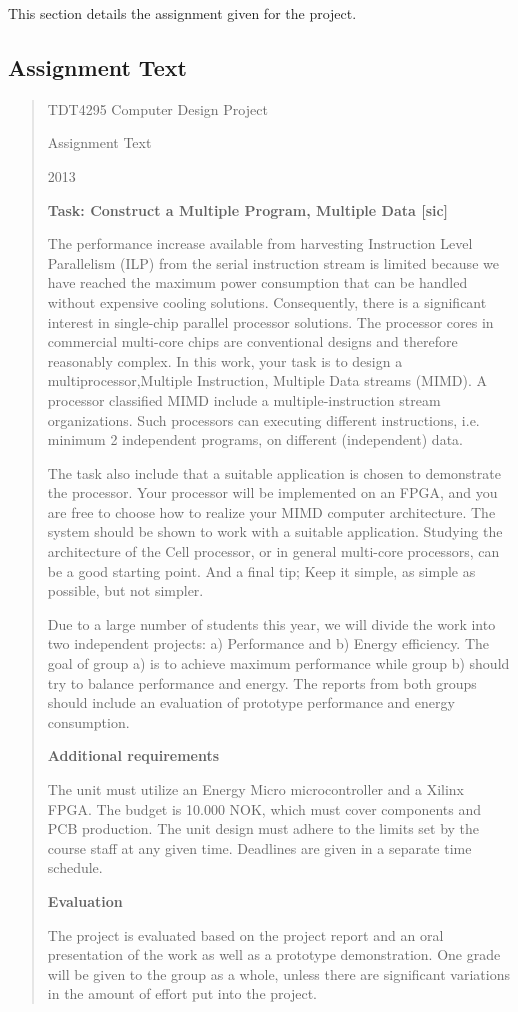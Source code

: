
This section details the assignment given for the project.

\subsection{Assignment Text}
\label{subsection:assignment-text}

\begin{quote}

\begin{center}
TDT4295 Computer Design Project

Assignment Text

2013 
\end{center}
 
\textbf{Task: Construct a Multiple Program, Multiple Data [sic]}

The performance increase available from harvesting Instruction Level Parallelism (ILP) from the serial instruction stream is limited because we have reached the maximum power consumption that can be handled without expensive cooling solutions.
Consequently, there is a significant interest in single-chip parallel processor solutions.
The processor cores in commercial multi-core chips are conventional designs and therefore reasonably complex.
In this work, your task is to design a multiprocessor,Multiple Instruction, Multiple Data streams (MIMD).
A processor classified MIMD include a multiple-instruction stream organizations.
Such processors can executing different instructions, i.e. minimum 2 independent programs, on different (independent) data.

The task also include that a suitable application is chosen to demonstrate the processor.
Your processor will be implemented on an FPGA, and you are free to choose how to realize your MIMD computer architecture.
The system should be shown to work with a suitable application.
Studying the architecture of the Cell processor, or in general multi-core processors, can be a good starting point.
And a final tip; Keep it simple, as simple as possible, but not simpler.

Due to a large number of students this year, we will divide the work into two independent projects: a) Performance and b) Energy efficiency.
The goal of group a) is to achieve maximum performance while group b) should try to balance performance and energy.
The reports from both groups should include an evaluation of prototype performance and energy consumption.

\textbf{Additional requirements}

The unit must utilize an Energy Micro microcontroller and a Xilinx FPGA.
The budget is 10.000 NOK, which must cover components and PCB production.
The unit design must adhere to the limits set by the course staff at any given time.
Deadlines are given in a separate time schedule.

\textbf{Evaluation}

The project is evaluated based on the project report and an oral presentation of the work as well as a prototype demonstration.
One grade will be given to the group as a whole, unless there are significant variations in the amount of effort put into the project. 
\cite{assignment-text}
\end{quote}


